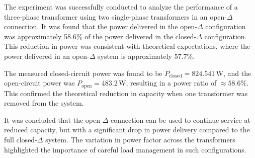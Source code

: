 \documentclass[a4paper,12pt]{article}
\begin{document}
The experiment was successfully conducted to analyze the performance of a three-phase transformer using two single-phase transformers in an open-$\Delta$ connection. It was found that the power delivered in the open-$\Delta$ configuration was approximately 58.6\% of the power delivered in the closed-$\Delta$ configuration. This reduction in power was consistent with theoretical expectations, where the power delivered in an open-$\Delta$ system is approximately 57.7\%.

The measured closed-circuit power was found to be \( P_{\text{closed}} = 824.541 \, \text{W} \), and the open-circuit power was \( P_{\text{open}} = 483.2 \, \text{W} \), resulting in a power ratio of \( \approx 58.6\% \). This confirmed the theoretical reduction in capacity when one transformer was removed from the system.

It was concluded that the open-$\Delta$ connection can be used to continue service at reduced capacity, but with a significant drop in power delivery compared to the full closed-$\Delta$ system. The variation in power factor across the transformers highlighted the importance of careful load management in such configurations.
\end{document}
